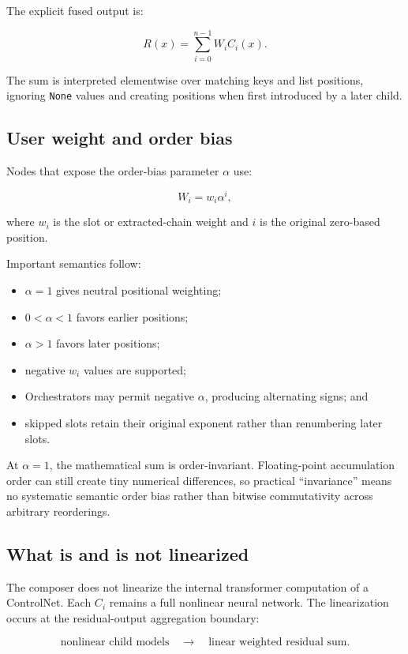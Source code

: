 \documentclass[11pt]{article}
\newcommand{\code}[1]{\texttt{#1}}
\begin{document}
The explicit fused output is:

\[
R(x) = \sum_{i=0}^{n-1} W_i C_i(x).
\]

The sum is interpreted elementwise over matching keys and list positions, ignoring \code{None} values and creating positions when first introduced by a later child.

\subsection{User weight and order bias}

Nodes that expose the order-bias parameter $\alpha$ use:

\[
W_i = w_i \alpha^i,
\]

where $w_i$ is the slot or extracted-chain weight and $i$ is the original zero-based position.

Important semantics follow:

\begin{itemize}
  \item $\alpha=1$ gives neutral positional weighting;
  \item $0<\alpha<1$ favors earlier positions;
  \item $\alpha>1$ favors later positions;
  \item negative $w_i$ values are supported;
  \item Orchestrators may permit negative $\alpha$, producing alternating signs; and
  \item skipped slots retain their original exponent rather than renumbering later slots.
\end{itemize}

At $\alpha=1$, the mathematical sum is order-invariant. Floating-point accumulation order can still create tiny numerical differences, so practical ``invariance'' means no systematic semantic order bias rather than bitwise commutativity across arbitrary reorderings.

\subsection{What is and is not linearized}

The composer does not linearize the internal transformer computation of a ControlNet. Each $C_i$ remains a full nonlinear neural network. The linearization occurs at the residual-output aggregation boundary:

\[
\text{nonlinear child models} \quad \longrightarrow \quad \text{linear weighted residual sum}.
\]
\end{document}
